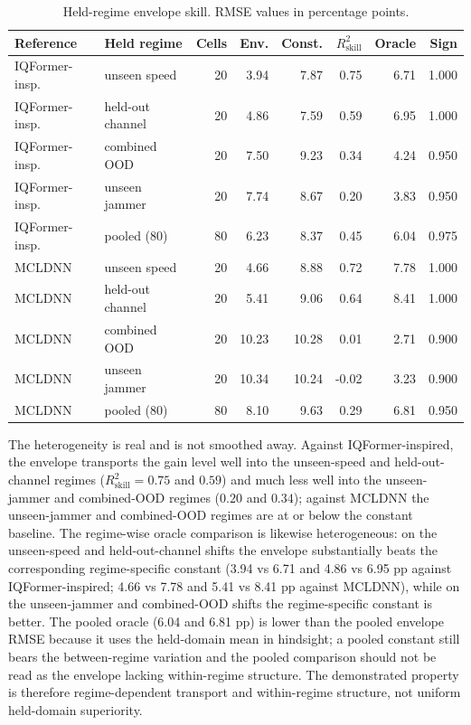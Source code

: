 \documentclass[letterpaper,onecolumn,11pt,journal]{IEEEtran}
\newcommand{\pp}{percentage points}
\begin{document}
\begin{table}[t]
\centering
\caption{Held-regime envelope skill. RMSE values in \pp.}
\label{tab:regime}
\scriptsize
\setlength{\tabcolsep}{2.4pt}
\begin{tabular}{llrrrrrr}
\toprule
Reference & Held regime & Cells & Env. & Const. & $R^2_{\mathrm{skill}}$ & Oracle & Sign\\
\midrule
IQFormer-insp. & unseen speed & 20 & 3.94 & 7.87 & 0.75 & 6.71 & 1.000\\
IQFormer-insp. & held-out channel & 20 & 4.86 & 7.59 & 0.59 & 6.95 & 1.000\\
IQFormer-insp. & combined OOD & 20 & 7.50 & 9.23 & 0.34 & 4.24 & 0.950\\
IQFormer-insp. & unseen jammer & 20 & 7.74 & 8.67 & 0.20 & 3.83 & 0.950\\
IQFormer-insp. & pooled (80) & 80 & 6.23 & 8.37 & 0.45 & 6.04 & 0.975\\
\midrule
MCLDNN & unseen speed & 20 & 4.66 & 8.88 & 0.72 & 7.78 & 1.000\\
MCLDNN & held-out channel & 20 & 5.41 & 9.06 & 0.64 & 8.41 & 1.000\\
MCLDNN & combined OOD & 20 & 10.23 & 10.28 & 0.01 & 2.71 & 0.900\\
MCLDNN & unseen jammer & 20 & 10.34 & 10.24 & -0.02 & 3.23 & 0.900\\
MCLDNN & pooled (80) & 80 & 8.10 & 9.63 & 0.29 & 6.81 & 0.950\\
\bottomrule
\end{tabular}
\end{table}

The heterogeneity is real and is not smoothed away. Against
IQFormer-inspired, the envelope transports the gain level well into the
unseen-speed and held-out-channel regimes ($R^2_{\mathrm{skill}}=0.75$ and
$0.59$) and much less well into the unseen-jammer and combined-OOD regimes
($0.20$ and $0.34$); against MCLDNN the unseen-jammer and combined-OOD regimes
are at or below the constant baseline. The regime-wise oracle comparison is
likewise heterogeneous: on the unseen-speed and held-out-channel shifts the
envelope substantially beats the corresponding regime-specific constant
(3.94 vs 6.71 and 4.86 vs 6.95 pp against IQFormer-inspired; 4.66 vs 7.78
and 5.41 vs 8.41 pp against MCLDNN), while on the unseen-jammer and
combined-OOD shifts the regime-specific constant is better. The pooled oracle
(6.04 and 6.81 pp) is lower than the pooled envelope RMSE because it
uses the held-domain mean in hindsight; a pooled constant still bears the
between-regime variation and the pooled comparison should not be read as the
envelope lacking within-regime structure. The demonstrated property is
therefore regime-dependent transport and within-regime structure, not uniform
held-domain superiority.
\end{document}
